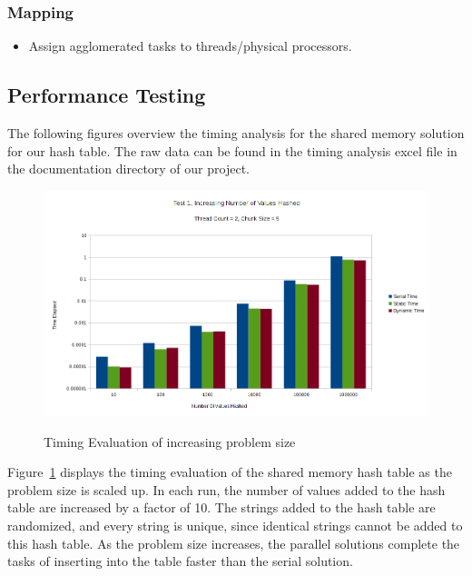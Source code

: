 \documentclass{article}
\begin{document}
\subsubsection{Mapping}
        \begin{itemize}
            \item Assign agglomerated tasks to threads/physical processors.
        \end{itemize}


\subsection{Performance Testing}
The following figures overview the timing analysis for the shared memory solution for our hash table.
The raw data can be found in the timing analysis excel file in the documentation directory of
our project.
\begin{figure}[H]
  \caption{Timing Evaluation of increasing problem size}
  \centering
  \includegraphics[width=\textwidth]{chart1a}
  \label{fig:chart1a}
\end{figure}

Figure~\ref{fig:chart1a} displays the timing evaluation of the shared memory hash table as the problem 
size is scaled up. In each run, the number of values added to the hash table are increased by a factor 
of 10. The strings added to the hash table are randomized, and every string is unique, since identical 
strings cannot be added to this hash table. As the problem size increases, the parallel solutions complete 
the tasks of inserting into the table faster than the serial solution.
\end{document}
